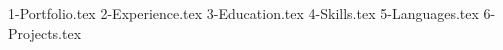 \documentclass[margin]{res}
\let\orighref\href
\renewcommand{\href}[2]{\orighref{#1}{#2\,\faExternalLink}}
\begin{document}
    \address{\\ E-MAIL \ : \href{mailto:louiszhenyean@gmail.com}{louiszhenyean@gmail.com}}
    \address{\\ LOCATION \ : IPOH, MALAYSIA \\ \\}
    \begin{resume}\vspace{0.2cm}
        {1-Portfolio.tex}
        {2-Experience.tex}
        {3-Education.tex} \clearpage
        {4-Skills.tex} 
        {5-Languages.tex} 
        {6-Projects.tex} 
    \end{resume}
\textheight=700pt
\(\)
\end{document}
